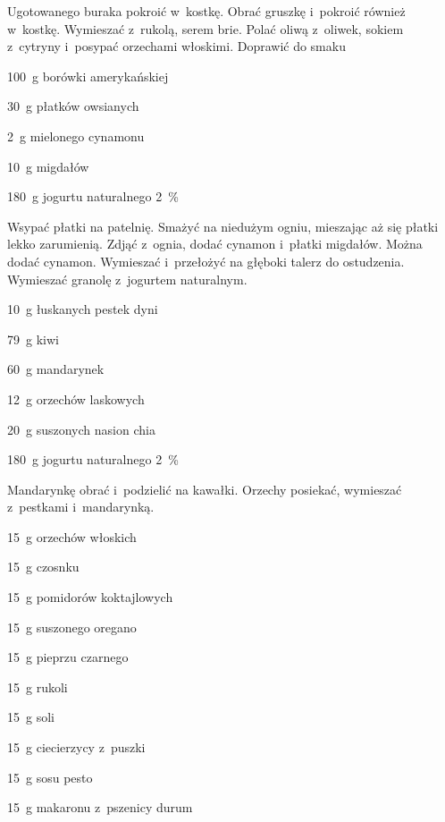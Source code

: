 \documentclass[../kucharek.tex]{subfiles}
\begin{document}
Ugotowanego buraka pokroić w~kostkę. Obrać gruszkę i~pokroić również w~kostkę.
Wymieszać z~rukolą, serem brie. Polać oliwą z~oliwek, sokiem z~cytryny
i~posypać orzechami włoskimi. Doprawić do smaku


\begin{Ingred}
    \item \qty{100}{\gram} borówki amerykańskiej
    \item \qty{30}{\gram} płatków owsianych
    \item \qty{2}{\gram} mielonego cynamonu
    \item \qty{10}{\gram} migdałów
    \item \qty{180}{\gram} jogurtu naturalnego \qty{2}{\percent}
\end{Ingred}

Wsypać płatki na patelnię. Smażyć na niedużym ogniu, mieszając aż się płatki
lekko zarumienią. Zdjąć z~ognia, dodać cynamon i~płatki migdałów. Można dodać
cynamon. Wymieszać i~przełożyć na głęboki talerz do ostudzenia. Wymieszać
granolę z~jogurtem naturalnym.


\begin{Ingred}
    \item \qty{10}{\gram} łuskanych pestek dyni
    \item \qty{79}{\gram} kiwi
    \item \qty{60}{\gram} mandarynek
    \item \qty{12}{\gram} orzechów laskowych
    \item \qty{20}{\gram} suszonych nasion chia
    \item \qty{180}{\gram} jogurtu naturalnego \qty{2}{\percent}
\end{Ingred}

Mandarynkę obrać i~podzielić na kawałki. Orzechy posiekać, wymieszać z~pestkami
i~mandarynką.


\begin{Ingred}
    \item \qty{15}{\gram} orzechów włoskich
    \item \qty{15}{\gram} czosnku
    \item \qty{15}{\gram} pomidorów koktajlowych
    \item \qty{15}{\gram} suszonego oregano
    \item \qty{15}{\gram} pieprzu czarnego
    \item \qty{15}{\gram} rukoli
    \item \qty{15}{\gram} soli
    \item \qty{15}{\gram} ciecierzycy z~puszki
    \item \qty{15}{\gram} sosu pesto
    \item \qty{15}{\gram} makaronu z~pszenicy durum
\end{Ingred}
\end{document}
